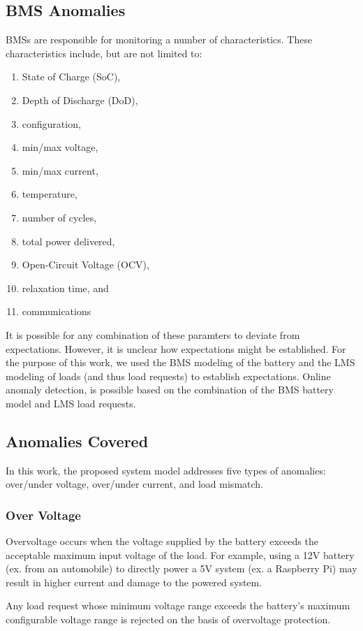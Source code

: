 \documentclass[11pt,conference,draftcls,onecolumn]{IEEEtran}
\begin{document}
\subsection{BMS Anomalies}
BMSs are responsible for monitoring a number of characteristics. These characteristics include, but are not limited to:
\begin{enumerate}
    \item State of Charge (SoC),
    \item Depth of Discharge (DoD),
    \item configuration,
    \item min/max voltage,
    \item min/max current,
    \item temperature,
    \item number of cycles,
    \item total power delivered,
    \item Open-Circuit Voltage (OCV),
    \item relaxation time, and
    \item communications
\end{enumerate}

It is possible for any combination of these paramters to deviate from expectations.
However, it is unclear how expectations might be established.
For the purpose of this work, we used the BMS modeling of the battery and the LMS modeling of loads (and thus load requests) to establish expectations.
Online anomaly detection, is possible based on the combination of the BMS battery model and LMS load requests.

\subsection{Anomalies Covered}
In this work, the proposed system model addresses five types of anomalies: over/under voltage, over/under current, and load mismatch.

\subsubsection{Over Voltage}
Overvoltage occurs when the voltage supplied by the battery exceeds the acceptable maximum input voltage of the load.
For example, using a 12V battery (ex. from an automobile) to directly power a 5V system (ex. a Raspberry Pi) may result in higher current and damage to the powered system.

Any load request whose minimum voltage range exceeds the battery's maximum configurable voltage range is rejected on the basis of overvoltage protection.
\end{document}
